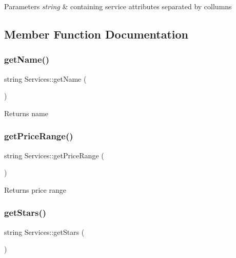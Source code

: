 \begin{DoxyParams}{Parameters}
{\em string} & containing service attributes separated by collumns \\
\hline
\end{DoxyParams}


\subsection{Member Function Documentation}
\mbox{\label{class_services_a71c420517519b0316b771c637044b76a}} 
\subsubsection{\texorpdfstring{get\+Name()}{getName()}}
{\footnotesize\ttfamily string Services\+::get\+Name (\begin{DoxyParamCaption}{ }\end{DoxyParamCaption})\hspace{0.3cm}{\ttfamily [inline]}}

\begin{DoxyReturn}{Returns}
name 
\end{DoxyReturn}
\mbox{\label{class_services_ac4c520cb327c737a775be426ffae1165}} 
\subsubsection{\texorpdfstring{get\+Price\+Range()}{getPriceRange()}}
{\footnotesize\ttfamily string Services\+::get\+Price\+Range (\begin{DoxyParamCaption}{ }\end{DoxyParamCaption})\hspace{0.3cm}{\ttfamily [inline]}}

\begin{DoxyReturn}{Returns}
price range 
\end{DoxyReturn}
\mbox{\label{class_services_a35360c22f682d48fd7271f9c5017c7a5}} 
\subsubsection{\texorpdfstring{get\+Stars()}{getStars()}}
{\footnotesize\ttfamily string Services\+::get\+Stars (\begin{DoxyParamCaption}{ }\end{DoxyParamCaption})\hspace{0.3cm}{\ttfamily [inline]}}

